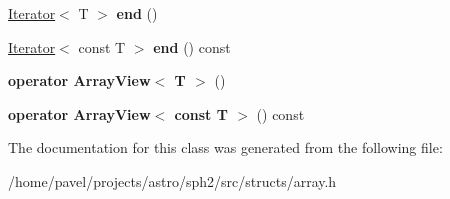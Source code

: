 \begin{DoxyCompactItemize}
\hyperlink{classIterator}{Iterator}$<$ T $>$ {\bfseries end} ()
\item 
\hypertarget{classStaticArray_ab534dbf8ab31f24d408627d69e45b9d2}{}\label{classStaticArray_ab534dbf8ab31f24d408627d69e45b9d2} 
\hyperlink{classIterator}{Iterator}$<$ const T $>$ {\bfseries end} () const
\item 
\hypertarget{classStaticArray_a321406d3a975ebc881e17d5ab5638a3f}{}\label{classStaticArray_a321406d3a975ebc881e17d5ab5638a3f} 
{\bfseries operator Array\+View$<$ T $>$} ()
\item 
\hypertarget{classStaticArray_a99becbd90a901d41d69aa0fddc05c341}{}\label{classStaticArray_a99becbd90a901d41d69aa0fddc05c341} 
{\bfseries operator Array\+View$<$ const T $>$} () const
\end{DoxyCompactItemize}


The documentation for this class was generated from the following file\+:\begin{DoxyCompactItemize}
\item 
/home/pavel/projects/astro/sph2/src/structs/array.\+h\end{DoxyCompactItemize}
